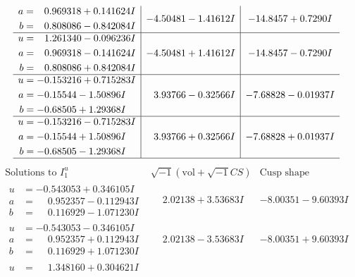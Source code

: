 \documentclass[1p]{elsarticle_modified}
\theoremstyle{definition}
\newcommand{\I}{\sqrt{-1}}
\begin{document}
$$\begin{array}{c|c|c}
\begin{aligned}
a &= \phantom{-}0.969318 + 0.141624 I \\
b &= \phantom{-}0.808086 - 0.842084 I\end{aligned}
 & -4.50481 - 1.41612 I & -14.8457 + 0.7290 I \\ \hline\begin{aligned}
u &= \phantom{-}1.261340 - 0.096236 I \\
a &= \phantom{-}0.969318 - 0.141624 I \\
b &= \phantom{-}0.808086 + 0.842084 I\end{aligned}
 & -4.50481 + 1.41612 I & -14.8457 - 0.7290 I \\ \hline\begin{aligned}
u &= -0.153216 + 0.715283 I \\
a &= -0.15544 - 1.50896 I \\
b &= -0.68505 + 1.29368 I\end{aligned}
 & \phantom{-}3.93766 - 0.32566 I & -7.68828 - 0.01937 I \\ \hline\begin{aligned}
u &= -0.153216 - 0.715283 I \\
a &= -0.15544 + 1.50896 I \\
b &= -0.68505 - 1.29368 I\end{aligned}
 & \phantom{-}3.93766 + 0.32566 I & -7.68828 + 0.01937 I\\
 \hline 
 \end{array}$$\newpage$$\begin{array}{c|c|c}  
\text{Solutions to }I^u_{1}& \I (\text{vol} + \sqrt{-1}CS) & \text{Cusp shape}\\
 \hline 
\begin{aligned}
u &= -0.543053 + 0.346105 I \\
a &= \phantom{-}0.952357 - 0.112943 I \\
b &= \phantom{-}0.116929 - 1.071230 I\end{aligned}
 & \phantom{-}2.02138 + 3.53683 I & -8.00351 - 9.60393 I \\ \hline\begin{aligned}
u &= -0.543053 - 0.346105 I \\
a &= \phantom{-}0.952357 + 0.112943 I \\
b &= \phantom{-}0.116929 + 1.071230 I\end{aligned}
 & \phantom{-}2.02138 - 3.53683 I & -8.00351 + 9.60393 I \\ \hline\begin{aligned}
u &= \phantom{-}1.348160 + 0.304621 I \\

\end{aligned}
\end{array}$$
\end{document}
